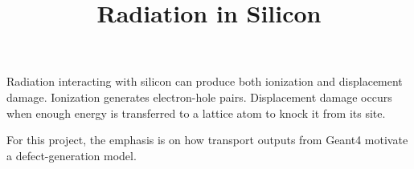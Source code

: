 \documentclass[11pt]{article}
\title{Radiation in Silicon}
\begin{document}
\maketitle

Radiation interacting with silicon can produce both ionization and displacement damage. Ionization generates electron-hole pairs. Displacement damage occurs when enough energy is transferred to a lattice atom to knock it from its site.

For this project, the emphasis is on how transport outputs from Geant4 motivate a defect-generation model.
\end{document}
